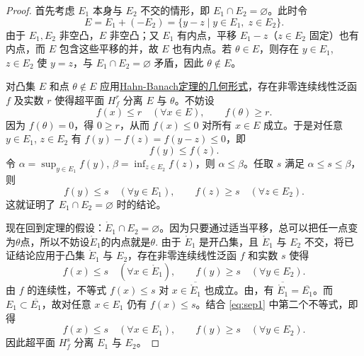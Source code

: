 \documentclass[../../main.tex]{subfiles}%
\begin{document}
\begin{proof}

首先考虑 $E_1$ 本身与 $E_2$ 不交的情形，即 $E_1 \cap E_2 = \varnothing$。此时令
\[
E = E_1 + (-E_2) = \{y - z \mid y \in E_1,\; z \in E_2\}.
\]
由于 $E_1, E_2$ 非空凸，$E$ 非空凸；又 $E_1$ 有内点，平移 $E_1 - z$（$z \in E_2$ 固定）也有内点，而 $E$ 包含这些平移的并，故 $E$ 也有内点。若 $\theta \in E$，则存在 $y\in E_1$, $z\in E_2$ 使 $y=z$，与 $E_1\cap E_2=\varnothing$ 矛盾，因此 $\theta \notin E$。

对凸集 $E$ 和点 $\theta\notin E$ 应用\hyperref[theorem:Hahn-Banach定理的几何形式]{Hahn-Banach定理的几何形式}，存在非零连续线性泛函 $f$ 及实数 $r$ 使得超平面 $H_f^r$ 分离 $E$ 与 $\theta$。不妨设
\[
f(x) \leqslant r \quad (\forall x \in E),\qquad f(\theta) \geqslant r.
\]
因为 $f(\theta)=0$，得 $0 \geqslant r$，从而 $f(x) \leqslant 0$ 对所有 $x\in E$ 成立。于是对任意 $y\in E_1$, $z\in E_2$ 有 $f(y)-f(z)=f(y-z)\leqslant 0$，即
\[
f(y) \leqslant f(z).
\]
令 $\alpha = \sup_{y\in E_1} f(y)$, $\beta = \inf_{z\in E_2} f(z)$，则 $\alpha \leqslant \beta$。任取 $s$ 满足 $\alpha \leqslant s \leqslant \beta$，则
\[
f(y) \leqslant s \quad (\forall y\in E_1), \qquad f(z) \geqslant s \quad (\forall z\in E_2).
\]
这就证明了 $E_1\cap E_2=\varnothing$ 时的结论。

现在回到定理的假设：$\mathring{E}_1 \cap E_2 = \varnothing$。因为只要通过适当平移，总可以把任一点变为$\theta$点，所以不妨设$\mathring{E}_1$的内点就是$\theta$.
由于 $\mathring{E}_1$ 是开凸集，且 $\mathring{E}_1$ 与 $E_2$ 不交，将已证结论应用于凸集 $\mathring{E}_1$ 与 $E_2$，存在非零连续线性泛函 $f$ 和实数 $s$ 使得
\begin{equation}\label{eq:sep1}
f(x) \leqslant s \quad (\forall x \in \mathring{E}_1), \qquad 
f(y) \geqslant s \quad (\forall y \in E_2).
\end{equation}
由 $f$ 的连续性，不等式 $f(x) \leqslant s$ 对 $x\in \overline{\mathring{E}_1}$ 也成立。由，有 $\overline{\mathring{E}_1} = \overline{E_1}$。而 $E_1 \subset \overline{E_1}$，故对任意 $x\in E_1$ 仍有 $f(x) \leqslant s$。结合 \eqref{eq:sep1} 中第二个不等式，即得
\[
f(x) \leqslant s \quad (\forall x \in E_1), \qquad 
f(y) \geqslant s \quad (\forall y \in E_2).
\]
因此超平面 $H_f^s$ 分离 $E_1$ 与 $E_2$。
\end{proof}
\end{document}
